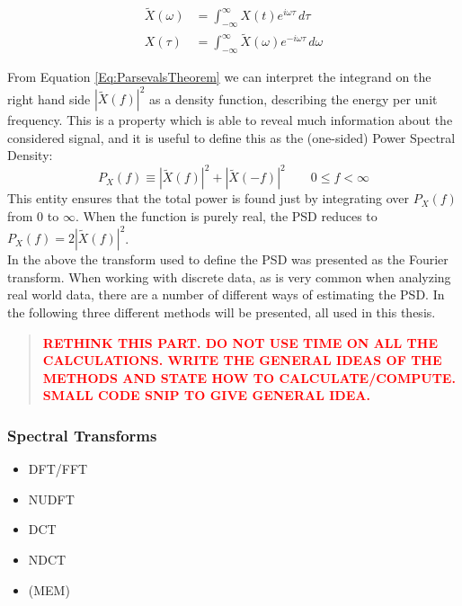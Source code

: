 \documentclass[../../CompleteThesis/Complete_1stDraft]{subfiles}
\begin{document}
	\begin{equation}
		\begin{aligned}
			\tilde{X}(\omega) &= \int_{-\infty}^{\infty} X(t) e^{i\omega\tau}\, d\tau \\
			X(\tau) &= \int_{-\infty}^{\infty} \tilde{X}(\omega) e^{-i\omega\tau}\, d\omega
			\label{Eq:FourierTransformAngular}
		\end{aligned} 
	\end{equation}
	
	From Equation \ref{Eq:ParsevalsTheorem} we can interpret the integrand on the right hand side $|\tilde{X}(f)|^2$ as a density function, describing the energy per unit frequency. This is a property which is able to reveal much information about the considered signal, and it is useful to define this as the (one-sided) Power Spectral Density: 
	\begin{equation}
		P_X(f) \equiv |\tilde{X}(f)|^2 + |\tilde{X}(-f)|^2 \qquad 0 \leq f < \infty
	\end{equation}
	This entity ensures that the total power is found just by integrating over $P_X(f)$ from 0 to $\infty$. When the function is purely real, the PSD reduces to $P_X(f) = 2|\tilde{X}(f)|^2$.\\
	In the above the transform used to define the PSD was presented as the Fourier transform. When working with discrete data, as is very common when analyzing real world data, there are a number of different ways of estimating the PSD. In the following three different methods will be presented, all used in this thesis.
	\newline
	\begin{quote}
		\textcolor{red}{\textbf{RETHINK THIS PART. DO NOT USE TIME ON ALL THE CALCULATIONS. WRITE THE GENERAL IDEAS OF THE METHODS AND STATE HOW TO CALCULATE/COMPUTE. SMALL CODE SNIP TO GIVE GENERAL IDEA.}}
	\end{quote}


	\subsubsection[Spectral Transforms][Spectral Transforms]{Spectral Transforms}
	\label{Subsubsec:SignalAnalysis_BackDiffusion_SpectralAnalysis_SpectralTransforms}
	
	\begin{itemize}
		\item DFT/FFT
		\item NUDFT
		\item DCT
		\item NDCT
		\item (MEM)
	\end{itemize}
\end{document}
